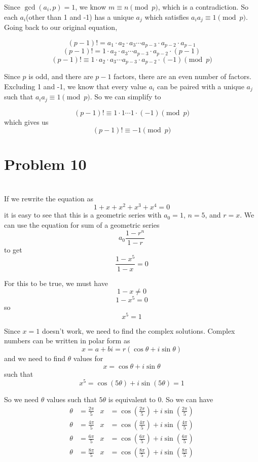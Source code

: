 \documentclass[12pt]{article}
\begin{document}
Since $\gcd(a_i,p)=1$, we know $m \equiv n\pmod{p}$, which is a contradiction. So each $a_i$(other than 1 and -1) has a unique $a_j$ which satisfies $a_ia_j \equiv 1 \pmod{p}$. Going back to our original equation,

\[(p-1)! = a_1 \cdot a_2 \cdot a_3 \cdots a_{p-3} \cdot a_{p-2} \cdot a_{p-1}\]
\[(p-1)! = 1 \cdot a_2 \cdot a_3 \cdots a_{p-3} \cdot a_{p-2} \cdot (p-1)\]
\[(p-1)! \equiv 1 \cdot a_2 \cdot a_3 \cdots a_{p-3} \cdot a_{p-2} \cdot (-1) \pmod{p}\]

Since $p$ is odd, and there are $p-1$ factors, there are an even number of factors. Excluding 1 and -1, we know that every value $a_i$ can be paired with a unique $a_j$ such that $a_ia_j \equiv 1 \pmod{p}$. So we can simplify to

\[(p-1)! \equiv 1 \cdot 1 \cdots 1 \cdot (-1) \pmod{p}\]
which gives us
\[(p-1)! \equiv -1 \pmod{p}\]


\newpage
\section*{Problem 10}
\\

If we rewrite the equation as
\[1 + x + x^2 + x^3 + x^4 = 0\]
it is easy to see that this is a geometric series with $a_0 = 1$, $n=5$, and $r=x$. We can use the equation for sum of a geometric series
\[a_0\frac{1-r^n}{1-r}\]
to get
\[\frac{1-x^5}{1-x} = 0\]

For this to be true, we must have
\[1-x \ne 0\]
\[1-x^5 = 0\]
so
\[x^5 = 1\]

Since $x=1$ doesn't work, we need to find the complex solutions. Complex numbers can be written in polar form as
\[x = a + bi = r(\cos\theta +i\sin\theta)\]
and we need to find $\theta$ values for
\[x = \cos\theta + i\sin\theta\]
such that
\[x^5 = \cos(5\theta) +i\sin(5\theta) = 1\]

So we need $\theta$ values such that $5\theta$ is equivalent to 0. So we can have
\begin{align*}
    \theta &= \frac{2\pi}{5} & x &= \cos(\frac{2\pi}{5}) + i\sin(\frac{2\pi}{5})\\
    \theta &= \frac{4\pi}{5} & x &= \cos(\frac{4\pi}{5}) + i\sin(\frac{4\pi}{5})\\
    \theta &= \frac{6\pi}{5} & x &= \cos(\frac{6\pi}{5}) + i\sin(\frac{6\pi}{5})\\
    \theta &= \frac{8\pi}{5} & x &= \cos(\frac{8\pi}{5}) + i\sin(\frac{8\pi}{5})
\end{align*}
\end{document}
